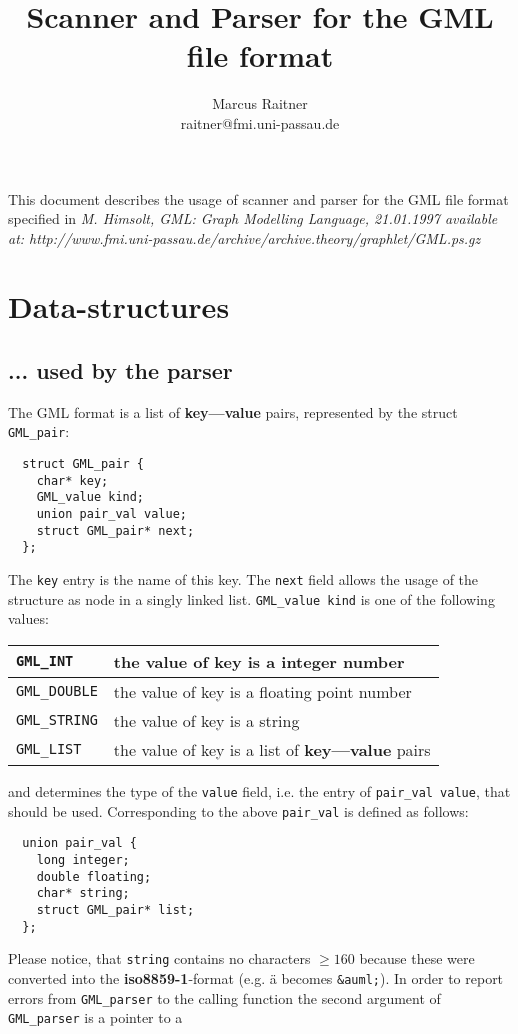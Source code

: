\documentclass[10pt,oneside,a4paper]{article}
\title{Scanner and Parser for the GML file format}
\author{Marcus Raitner \\ raitner@fmi.uni-passau.de}
\begin{document}
\maketitle
\noindent
This document describes the usage of scanner and parser for the GML file
format specified in \emph{M. Himsolt, GML: Graph Modelling Language, 
21.01.1997 available at: 
http://www.fmi.uni-passau.de/archive/archive.theory/graphlet/GML.ps.gz}
\section{Data-structures}
\subsection{... used by the parser}
The GML format is a list of \textbf{key---value} pairs, represented by the 
struct \verb+GML_pair+:

\begin{verbatim}
  struct GML_pair {
    char* key;
    GML_value kind;
    union pair_val value;
    struct GML_pair* next;
  };
\end{verbatim}
The \verb+key+ entry is the name of this key. 
The \verb+next+ field allows the usage of the structure as node in a singly 
linked list. \verb+GML_value kind+ is one of the following values:   

\medskip
\begin{tabular}{|l|l|} 
  \hline
  \verb+GML_INT+ & the value of key is a integer number \\ \hline
  \verb+GML_DOUBLE+ & the value of key is a floating point number \\ \hline
  \verb+GML_STRING+ & the value of key is a string \\ \hline
  \verb+GML_LIST+ & the value of key is a list of \textbf{key---value} 
  pairs \\
  \hline
\end{tabular}

\medskip\noindent
and determines the type of the \verb+value+ field, i.e. the entry of 
\verb+pair_val value+, that should be used. Corresponding to 
the above \verb+pair_val+ is defined as follows:

\begin{verbatim}
  union pair_val {
    long integer;
    double floating;
    char* string;
    struct GML_pair* list;
  };
\end{verbatim}
Please notice, that \verb+string+ contains no characters $\geq 160$ because
these were converted into the \textbf{iso8859-1}-format (e.g. \"a becomes 
\verb+&auml;+).
\clearpage\noindent
In order to report errors from \verb+GML_parser+ to the calling function
the second argument of \verb+GML_parser+ is a pointer to a
  
\end{document}
